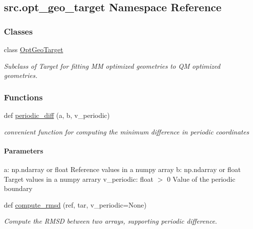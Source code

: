 \hypertarget{namespacesrc_1_1opt__geo__target}{}\subsection{src.\+opt\+\_\+geo\+\_\+target Namespace Reference}
\label{namespacesrc_1_1opt__geo__target}
\subsubsection*{Classes}
\begin{DoxyCompactItemize}
\item 
class \hyperlink{classsrc_1_1opt__geo__target_1_1OptGeoTarget}{Opt\+Geo\+Target}
\begin{DoxyCompactList}\small\item\em Subclass of Target for fitting MM optimized geometries to QM optimized geometries. \end{DoxyCompactList}\end{DoxyCompactItemize}
\subsubsection*{Functions}
\begin{DoxyCompactItemize}
\item 
def \hyperlink{namespacesrc_1_1opt__geo__target_afbe357b3c6d344e4549b0cff5400e027}{periodic\+\_\+diff} (a, b, v\+\_\+periodic)
\begin{DoxyCompactList}\small\item\em convenient function for computing the minimum difference in periodic coordinates \paragraph*{Parameters }

a\+: np.\+ndarray or float Reference values in a numpy array b\+: np.\+ndarray or float Target values in a numpy arrary v\+\_\+periodic\+: float $>$ 0 Value of the periodic boundary \end{DoxyCompactList}\item 
def \hyperlink{namespacesrc_1_1opt__geo__target_a646aaa5ddda0042e6c9ea15077fe0504}{compute\+\_\+rmsd} (ref, tar, v\+\_\+periodic=None)
\begin{DoxyCompactList}\small\item\em Compute the R\+M\+SD between two arrays, supporting periodic difference. \end{DoxyCompactList}\end{DoxyCompactItemize}
